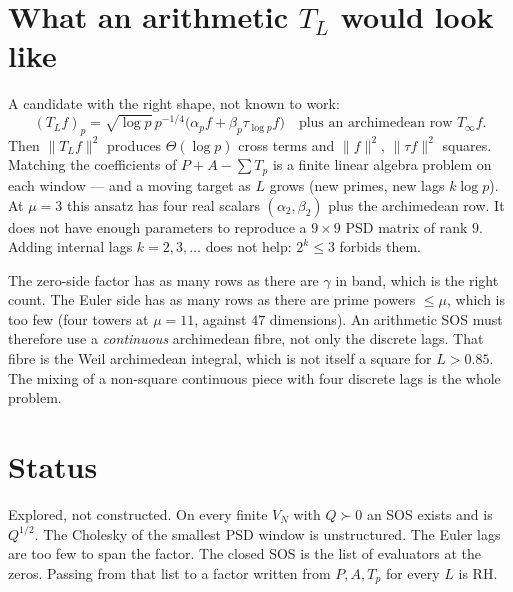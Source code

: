 \documentclass[11pt]{article}
\theoremstyle{remark}\newtheorem*{remark}{Remark}
\begin{document}
\section{What an arithmetic $T_L$ would look like}
A candidate with the right shape, not known to work:
\[
(T_Lf)_p
=\sqrt{\log p}\,p^{-1/4}\bigl(\alpha_p f+\beta_p\tau_{\log p}f\bigr)
\quad\text{plus an archimedean row $T_\infty f$.}
\]
Then $\|T_Lf\|^2$ produces $\Theta(\log p)$ cross terms and
$\|f\|^2$, $\|\tau f\|^2$ squares. Matching the coefficients of
$P+A-\sum T_p$ is a finite linear algebra problem on each window ---
and a moving target as $L$ grows (new primes, new lags $k\log p$).
At $\mu=3$ this ansatz has four real scalars $(\alpha_2,\beta_2)$ plus
the archimedean row. It does not have enough parameters to reproduce
a $9\times9$ PSD matrix of rank $9$. Adding internal lags
$k=2,3,\ldots$ does not help: $2^k\le3$ forbids them.

The zero-side factor has as many rows as there are $\gamma$ in band,
which is the right count. The Euler side has as many rows as there
are prime powers $\le\mu$, which is too few (four towers at
$\mu=11$, against $47$ dimensions). An arithmetic SOS must therefore
use a \emph{continuous} archimedean fibre, not only the discrete
lags. That fibre is the Weil archimedean integral, which is not
itself a square for $L>0.85$. The mixing of a non-square continuous
piece with four discrete lags is the whole problem.

\section*{Status}
Explored, not constructed. On every finite $V_N$ with $Q\succ0$ an
SOS exists and is $Q^{1/2}$. The Cholesky of the smallest PSD window
is unstructured. The Euler lags are too few to span the factor. The
closed SOS is the list of evaluators at the zeros. Passing from that
list to a factor written from $P,A,T_p$ for every $L$ is RH.
\end{document}
